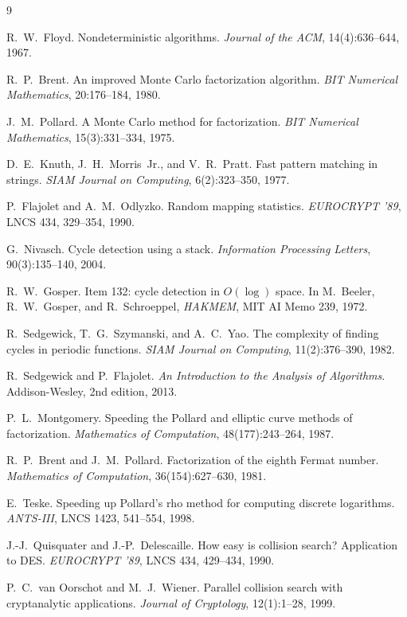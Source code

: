 \documentclass[11pt]{article}
\begin{document}
\begin{thebibliography}{9}

 R.~W.~Floyd. Nondeterministic algorithms.
\emph{Journal of the ACM}, 14(4):636--644, 1967.

 R.~P.~Brent. An improved Monte Carlo factorization algorithm.
\emph{BIT Numerical Mathematics}, 20:176--184, 1980.

 J.~M.~Pollard. A Monte Carlo method for factorization.
\emph{BIT Numerical Mathematics}, 15(3):331--334, 1975.

 D.~E.~Knuth, J.~H.~Morris~Jr., and V.~R.~Pratt. Fast pattern
matching in strings. \emph{SIAM Journal on Computing}, 6(2):323--350, 1977.

 P.~Flajolet and A.~M.~Odlyzko. Random mapping statistics.
\emph{EUROCRYPT '89}, LNCS 434, 329--354, 1990.

 G.~Nivasch. Cycle detection using a stack.
\emph{Information Processing Letters}, 90(3):135--140, 2004.

 R.~W.~Gosper. Item 132: cycle detection in $O(\log)$ space.
In M.~Beeler, R.~W.~Gosper, and R.~Schroeppel, \emph{HAKMEM}, MIT AI Memo 239, 1972.

 R.~Sedgewick, T.~G.~Szymanski, and A.~C.~Yao. The complexity of
finding cycles in periodic functions. \emph{SIAM Journal on Computing},
11(2):376--390, 1982.

 R.~Sedgewick and P.~Flajolet. \emph{An Introduction to
the Analysis of Algorithms}. Addison-Wesley, 2nd edition, 2013.

 P.~L.~Montgomery. Speeding the Pollard and elliptic curve
methods of factorization. \emph{Mathematics of Computation}, 48(177):243--264, 1987.

 R.~P.~Brent and J.~M.~Pollard. Factorization of the eighth
Fermat number. \emph{Mathematics of Computation}, 36(154):627--630, 1981.

 E.~Teske. Speeding up Pollard's rho method for computing
discrete logarithms. \emph{ANTS-III}, LNCS 1423, 541--554, 1998.

 J.-J.~Quisquater and J.-P.~Delescaille. How easy is collision
search? Application to DES. \emph{EUROCRYPT '89}, LNCS 434, 429--434, 1990.

 P.~C.~van Oorschot and M.~J.~Wiener. Parallel collision search
with cryptanalytic applications. \emph{Journal of Cryptology}, 12(1):1--28, 1999.

\end{thebibliography}
\end{document}

